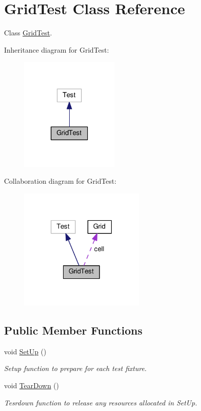 \hypertarget{classGridTest}{}\section{Grid\+Test Class Reference}
\label{classGridTest}


Class \hyperlink{classGridTest}{Grid\+Test}.  




Inheritance diagram for Grid\+Test\+:
\nopagebreak
\begin{figure}[H]
\begin{center}
\leavevmode
\includegraphics[width=134pt]{classGridTest__inherit__graph}
\end{center}
\end{figure}


Collaboration diagram for Grid\+Test\+:
\nopagebreak
\begin{figure}[H]
\begin{center}
\leavevmode
\includegraphics[width=170pt]{classGridTest__coll__graph}
\end{center}
\end{figure}
\subsection*{Public Member Functions}
\begin{DoxyCompactItemize}
\item 
void \hyperlink{classGridTest_accd5f48fb57e88ba96e50a6c4aca470c}{Set\+Up} ()
\begin{DoxyCompactList}\small\item\em Setup function to prepare for each test fixture. \end{DoxyCompactList}\item 
void \hyperlink{classGridTest_ac020afbb1a58be4930e0dc18e859704b}{Tear\+Down} ()
\begin{DoxyCompactList}\small\item\em Tesrdown function to release any resources allocated in Set\+Up. \end{DoxyCompactList}\end{DoxyCompactItemize}
